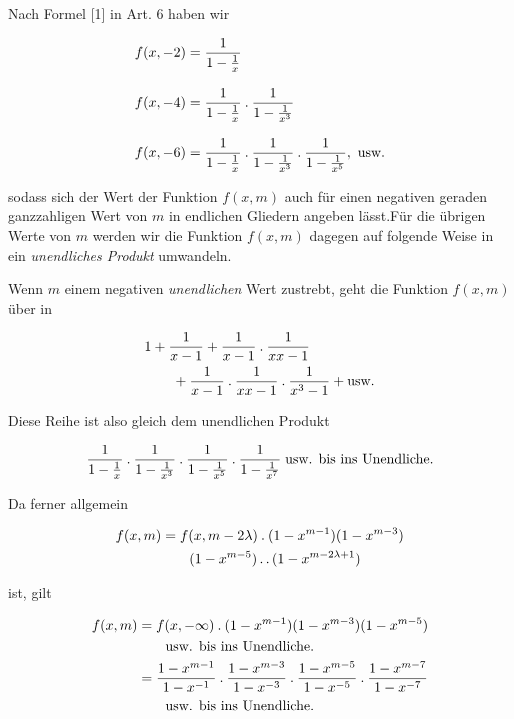 Nach Formel [1] in Art. 6 haben wir

\[
\begin{aligned}
f(x,-2)&=\frac{1}{1-\frac1x}\\[8pt]
f(x,-4)&=\frac{1}{1-\frac1x}\pdot\frac{1}{1-\frac1{x^3}}\\[8pt]
f(x,-6)&=\frac{1}{1-\frac1x}\pdot\frac{1}{1-\frac1{x^3}}\pdot\frac{1}{1-\frac1{x^5}},\ \text{usw.}
\end{aligned}
\]

sodass sich der Wert der Funktion $f(x,m)$ auch für einen negativen geraden ganzzahligen Wert von $m$ in endlichen Gliedern angeben lässt.\quad Für die übrigen Werte von $m$ werden wir die Funktion $f(x,m)$ dagegen auf folgende Weise in ein \emph{unendliches Produkt} umwandeln.

Wenn $m$ einem negativen \emph{unendlichen} Wert zustrebt, geht die Funktion $f(x,m)$ über in

\[
\begin{aligned}
&1+\frac1{x-1}+\frac1{x-1}\mathbin{.}\frac1{xx-1}\\
&\qquad+\frac1{x-1}\mathbin{.}\frac1{xx-1}\mathbin{.}\frac1{x^3-1}+\text{usw.}
\end{aligned}
\]

Diese Reihe ist also gleich dem unendlichen Produkt

\[
\begin{aligned}
\frac1{1-\frac1x}\mathbin{.}\frac1{1-\frac1{x^3}}\mathbin{.}\frac1{1-\frac1{x^5}}\mathbin{.}\frac1{1-\frac1{x^7}}\;\text{usw. bis ins Unendliche.}
\end{aligned}
\]

Da ferner allgemein

\[
\begin{aligned}
f(x,m)&=f(x,m-2\lambda)\mathbin{.}(1-x^{m-1})(1-x^{m-3})\\
&\qquad(1-x^{m-5})\mathinner{.\,.}(1-x^{m-2\lambda+1})
\end{aligned}
\]

ist, gilt

\[
\begin{aligned}
f(x,m)&=f(x,-\infty)\mathbin{.}(1-x^{m-1})(1-x^{m-3})(1-x^{m-5})\\
&\qquad\text{usw. bis ins Unendliche.}\\
&=\frac{1-x^{m-1}}{1-x^{-1}}\mathbin{.}\frac{1-x^{m-3}}{1-x^{-3}}\mathbin{.}\frac{1-x^{m-5}}{1-x^{-5}}\mathbin{.}\frac{1-x^{m-7}}{1-x^{-7}}\\
&\qquad\text{usw. bis ins Unendliche.}
\end{aligned}
\]

